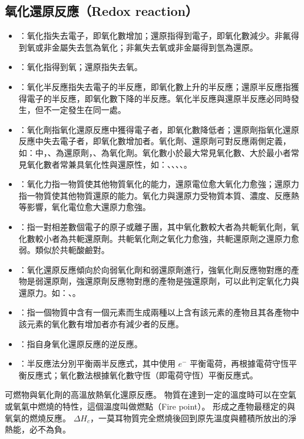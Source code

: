 \documentclass[a4paper,12pt]{article}
\begin{document}
\subsection{氧化還原反應（Redox reaction）}
\begin{itemize}
\item {}：氧化指失去電子，即氧化數增加；還原指得到電子，即氧化數減少。非氟得到氧或非金屬失去氫為氧化；非氟失去氧或非金屬得到氫為還原。
\item {}：氧化指得到氧；還原指失去氧。
\item {}：氧化半反應指失去電子的半反應，即氧化數上升的半反應；還原半反應指獲得電子的半反應，即氧化數下降的半反應。氧化半反應與還原半反應必同時發生，但不一定發生在同一處。
\item {}：氧化劑指氧化還原反應中獲得電子者，即氧化數降低者；還原劑指氧化還原反應中失去電子者，即氧化數增加者。氧化劑、還原劑可對反應兩側定義，如：中，、為還原劑，、為氧化劑。氧化數小於最大常見氧化數、大於最小者常見氧化數者常兼具氧化性與還原性，如：、、、、。
\item {}：氧化力指一物質使其他物質氧化的能力，還原電位愈大氧化力愈強；還原力指一物質使其他物質還原的能力。氧化力與還原力受物質本質、濃度、反應熱等影響，氧化電位愈大還原力愈強。
\item {}：指一對相差數個電子的原子或離子團，其中氧化數較大者為共軛氧化劑，氧化數較小者為共軛還原劑。共軛氧化劑之氧化力愈強，共軛還原劑之還原力愈弱。類似於共軛酸鹼對。
\item {}：氧化還原反應傾向於向弱氧化劑和弱還原劑進行，強氧化劑反應物對應的產物是弱還原劑，強還原劑反應物對應的產物是強還原劑，可以此判定氧化力與還原力。如：、。
\item {}：指一個物質中含有一個元素而生成兩種以上含有該元素的產物且其各產物中該元素的氧化數有增加者亦有減少者的反應。
\item {}：指自身氧化還原反應的逆反應。
\item {}：半反應法分別平衡兩半反應式，其中使用 $e^-$ 平衡電荷，再根據電荷守恆平衡反應式；氧化數法根據氧化數守恆（即電荷守恆）平衡反應式。
\end{itemize}
可燃物與氧化劑的高溫放熱氧化還原反應。
物質在達到一定的溫度時可以在空氣或氧氣中燃燒的特性，這個溫度叫做燃點（Fire point）。
形成之產物最穩定的與氧氣的燃燒反應。
$\Delta H_c$，一莫耳物質完全燃燒後回到原先溫度與體積所放出的淨熱能，必不為負。
\end{document}
